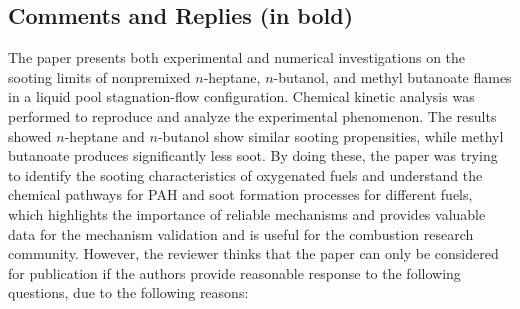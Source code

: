 \documentclass[10pt,letterpaper]{article}
\begin{document}
\subsection*{Comments and Replies (in bold)}

The paper presents both experimental and numerical investigations on the sooting limits of nonpremixed $n$-heptane, $n$-butanol, and methyl butanoate flames in a liquid pool stagnation-flow configuration. Chemical kinetic analysis was performed to reproduce and analyze the experimental phenomenon. The results showed $n$-heptane and $n$-butanol show similar sooting propensities, while methyl butanoate produces significantly less soot. By doing these, the paper was trying to identify the sooting characteristics of oxygenated fuels and understand the chemical pathways for PAH and soot formation processes for different fuels, which highlights the importance of reliable mechanisms and provides valuable data for the mechanism validation and is useful for the combustion research community. However, the reviewer thinks that the paper can only be considered for publication if the authors provide reasonable response to the following questions, due to the following reasons:
\end{document}
